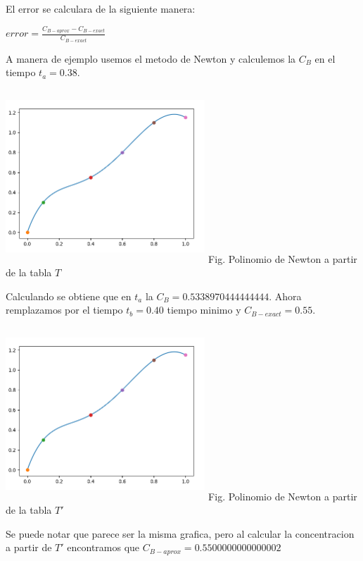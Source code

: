 \documentclass[10pt,a4paper]{article}
\begin{document}
\begin{multicols}{2}
		\noindent El error se calculara de la siguiente manera:
		\begin{center}
			$error = \frac{C_{B-aprox}-C_{B-exact}}{C_{B-exact}}$
		\end{center} 
		
		A manera de ejemplo usemos el metodo de Newton y calculemos la $C_B$ en el tiempo $t_a = 0.38$.
		
		\begin{center}
			\includegraphics[width=7.5cm,height=6.5cm]{Newton.png}
			Fig. Polinomio de Newton a partir de la tabla $T$
		\end{center}
		
		Calculando se obtiene que en $t_a$ la $C_B =0.5338970444444444$. Ahora remplazamos por el tiempo $t_b = 0.40$ tiempo minimo y $C_{B-exact} = 0.55$.
		\begin{center}
			\includegraphics[width=7.5cm,height=6.5cm]{Newton.png}
			Fig. Polinomio de Newton a partir de la tabla $T'$
		\end{center}
		
		Se puede notar que parece ser la misma grafica, pero al calcular la concentracion a partir de $T'$ encontramos que $C_{B-aprox} = 0.5500000000000002$
		
		 
		

\end{multicols}
\end{document}

